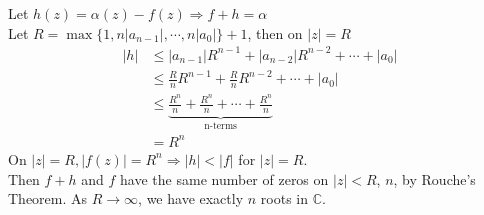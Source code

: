 \documentclass[11pt]{article}
\begin{document}
Let $h(z) = \alpha(z) - f(z) \Rightarrow f + h = \alpha$ \\
Let $R = \max \{1, n|a_{n - 1}|, \cdots, n|a_0|\} + 1$, then on $|z| = R$ 
\begin{align*}
|h| &\leqslant |a_{n - 1}|R^{n - 1} +  |a_{n - 2}|R^{n - 2} + \cdots + |a_0| \\
&\leqslant \frac{R}{n}R^{n - 1} + \frac{R}{n}R^{n - 2} + \cdots + |a_0| \\
&\leqslant \underbrace{\frac{R^n}{n} + \frac{R^n}{n} + \cdots + \frac{R^n}{n}}_{\text{n-terms}} \\
&= R^n
\end{align*}
On $|z| = R, |f(z)| = R^n \Rightarrow |h| < |f|$ for $|z| = R$. \\
Then $f + h$ and $f$ have the same number of zeros on $|z| < R$, $n$, by Rouche's Theorem. As $R \to \infty$, we have exactly $n$ roots in $\mathbb{C}$. 
\newpage
\end{document}

